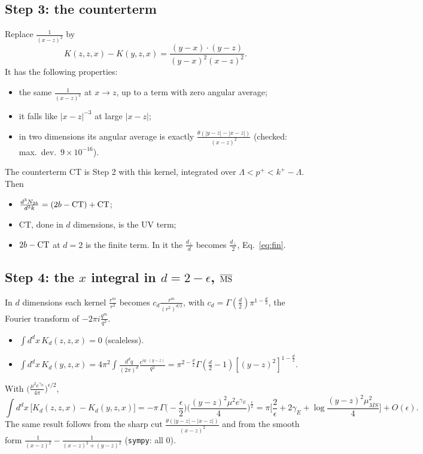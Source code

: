 \documentclass[10pt]{article}
\numberwithin{equation}{section}
\begin{document}
\subsection*{Step 3: the counterterm}
Replace $\frac{1}{(x-z)^2}$ by
\begin{equation}
K(z,z,x)-K(y,z,x)=\frac{(y-x)\cdot(y-z)}{(y-x)^{2}(x-z)^{2}} .
\end{equation}
It has the following properties:
\begin{itemize}
\item the same $\frac{1}{(x-z)^2}$ at $x\to z$, up to a term with zero angular average;
\item it falls like $|x-z|^{-3}$ at large $|x-z|$;
\item in two dimensions its angular average is exactly $\frac{\theta(|y-z|-|x-z|)}{(x-z)^2}$ (checked: max.\ dev.\ $9\times10^{-16}$).
\end{itemize}
The counterterm CT is Step 2 with this kernel, integrated over $\Lambda<p^+<k^+-\Lambda$. Then
\begin{itemize}
\item $\frac{d^3N_{2b}}{d^3k}=(2b-{\rm CT})+{\rm CT}$;
\item CT, done in $d$ dimensions, is the UV term;
\item $2b-{\rm CT}$ at $d=2$ is the finite term. In it the $\frac{d_\perp}{d}$ becomes $\frac{d_\perp}{2}$, Eq.~\eqref{eq:fin}.
\end{itemize}

\subsection*{Step 4: the \texorpdfstring{$x$}{x} integral in \texorpdfstring{$d=2-\epsilon$}{d=2-eps}, \texorpdfstring{$\overline{\rm MS}$}{MS-bar}}
In $d$ dimensions each kernel $\frac{r^m}{r^2}$ becomes $c_d\frac{r^m}{(r^2)^{d/2}}$, with $c_d=\Gamma(\frac d2)\pi^{1-\frac d2}$, the Fourier transform of $-2\pi i\frac{q^m}{q^2}$.
\begin{itemize}
\item $\int d^dx\,K_d(z,z,x)=0$ (scaleless).
\item $\int d^dx\,K_d(y,z,x)=4\pi^2\int\frac{d^dq}{(2\pi)^d}\frac{e^{iq\cdot(y-z)}}{q^2}=\pi^{2-\frac d2}\Gamma(\frac d2-1)[(y-z)^2]^{1-\frac d2}$.
\end{itemize}
With $\big(\frac{\mu^2e^{\gamma_E}}{4\pi}\big)^{\epsilon/2}$,
\begin{equation}
\int d^dx\,\big[K_d(z,z,x)-K_d(y,z,x)\big]=-\pi\,\Gamma\Big(-\frac\epsilon2\Big)\Big(\frac{(y-z)^2\mu^2e^{\gamma_E}}{4}\Big)^{\frac\epsilon2}=\pi\Big[\frac2\epsilon+2\gamma_E+\log\frac{(y-z)^2\mu^2_{\overline{MS}}}{4}\Big]+O(\epsilon).
\label{eq:dimreg}
\end{equation}
The same result follows from the sharp cut $\frac{\theta(|y-z|-|x-z|)}{(x-z)^2}$ and from the smooth form $\frac{1}{(x-z)^2}-\frac{1}{(x-z)^2+(y-z)^2}$ (\texttt{sympy}: all 0).
\end{document}
